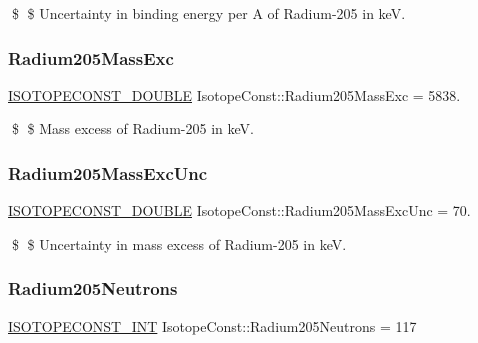 \$ \$ Uncertainty in binding energy per A of Radium-\/205 in keV. \mbox{\label{group___isotope_const-_radium-_ra205_ga01c6446f29ea988951e1133da127f03c}} 
\subsubsection{\texorpdfstring{Radium205\+Mass\+Exc}{Radium205MassExc}}
{\footnotesize\ttfamily \mbox{\hyperlink{group___isotope_const-_macros_ga8f45a7272ce02c0b4c65c44636ed719a}{I\+S\+O\+T\+O\+P\+E\+C\+O\+N\+S\+T\+\_\+\+D\+O\+U\+B\+LE}} Isotope\+Const\+::\+Radium205\+Mass\+Exc = 5838.}

\$ \$ Mass excess of Radium-\/205 in keV. \mbox{\label{group___isotope_const-_radium-_ra205_ga7061de5d1f48f9671cfbefdd98e70bc6}} 
\subsubsection{\texorpdfstring{Radium205\+Mass\+Exc\+Unc}{Radium205MassExcUnc}}
{\footnotesize\ttfamily \mbox{\hyperlink{group___isotope_const-_macros_ga8f45a7272ce02c0b4c65c44636ed719a}{I\+S\+O\+T\+O\+P\+E\+C\+O\+N\+S\+T\+\_\+\+D\+O\+U\+B\+LE}} Isotope\+Const\+::\+Radium205\+Mass\+Exc\+Unc = 70.}

\$ \$ Uncertainty in mass excess of Radium-\/205 in keV. \mbox{\label{group___isotope_const-_radium-_ra205_gab0d1c4cfe0e6ccf8c296807017ca01fe}} 
\subsubsection{\texorpdfstring{Radium205\+Neutrons}{Radium205Neutrons}}
{\footnotesize\ttfamily \mbox{\hyperlink{group___isotope_const-_macros_ga5f18360b3e99483a35c32d789e62621c}{I\+S\+O\+T\+O\+P\+E\+C\+O\+N\+S\+T\+\_\+\+I\+NT}} Isotope\+Const\+::\+Radium205\+Neutrons = 117}

